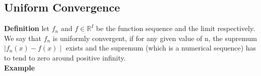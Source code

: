 \documentclass{article}
\begin{document}
\subsection{Uniform Convergence}
\textbf{Definition} let $f_{n}$ and $f \in \mathbb{R}^{I} $ be the function sequence and the limit respectively. We say that $f_{n}$ is uniformly convergent, 
if for any given value of n, the supremum $\mid f_{n} (x) - f(x) \mid$ exists and the supremum (which is a numerical sequence) has to tend to zero around positive infinity.\\
\textbf{Example}
\end{document}
